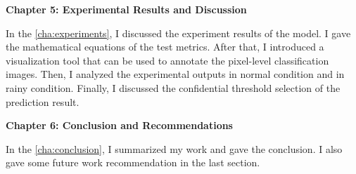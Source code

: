 \begin{spacing}{1.5}
{\large\textbf{Chapter 5: Experimental Results and Discussion}}

In the \autoref{cha:experiments}, I discussed the experiment results of the model. I gave the mathematical equations of the test metrics. After that, I introduced a visualization tool that can be used to annotate the pixel-level classification images. Then, I analyzed the experimental outputs in normal condition and in rainy condition. Finally, I discussed the confidential threshold selection of the prediction result.

{\large\textbf{Chapter 6: Conclusion and Recommendations}}

In the \autoref{cha:conclusion}, I summarized my work and gave the conclusion. I also gave some future work recommendation in the last section.

\end{spacing}
\newpage



